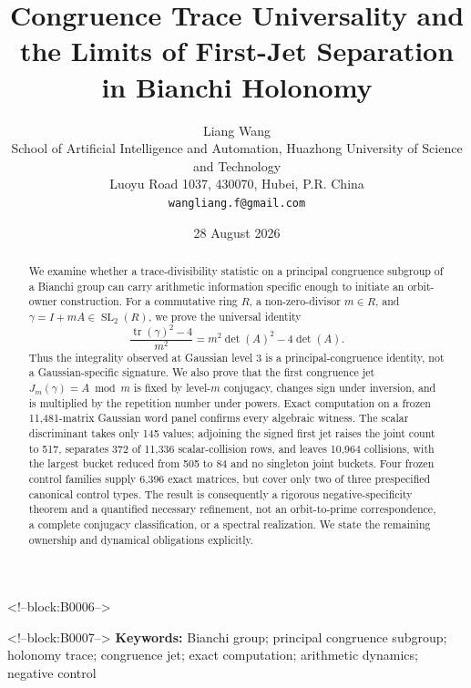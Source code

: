 \documentclass[11pt,a4paper]{article}
\title{Congruence Trace Universality and the Limits of First-Jet Separation in Bianchi Holonomy}
\author{Liang Wang\\
\small School of Artificial Intelligence and Automation, Huazhong University of Science and Technology\\
\small Luoyu Road 1037, 430070, Hubei, P.R. China\\
\small \texttt{wangliang.f@gmail.com}}
\date{28 August 2026}
\theoremstyle{definition}
\theoremstyle{remark}
\newcommand{\SL}{\operatorname{SL}}
\newcommand{\tr}{\operatorname{tr}}
\begin{document}
\maketitle

<!--block:B0006-->
\begin{abstract}
We examine whether a trace-divisibility statistic on a principal congruence subgroup of a Bianchi group can carry arithmetic information specific enough to initiate an orbit-owner construction. For a commutative ring \(R\), a non-zero-divisor \(m\in R\), and \(\gamma=I+mA\in\SL_2(R)\), we prove the universal identity
\[
  \frac{\tr(\gamma)^2-4}{m^2}=m^2\det(A)^2-4\det(A).
\]
Thus the integrality observed at Gaussian level \(3\) is a principal-congruence identity, not a Gaussian-specific signature. We also prove that the first congruence jet \(J_m(\gamma)=A\bmod m\) is fixed by level-\(m\) conjugacy, changes sign under inversion, and is multiplied by the repetition number under powers. Exact computation on a frozen 11,481-matrix Gaussian word panel confirms every algebraic witness. The scalar discriminant takes only 145 values; adjoining the signed first jet raises the joint count to 517, separates 372 of 11,336 scalar-collision rows, and leaves 10,964 collisions, with the largest bucket reduced from 505 to 84 and no singleton joint buckets. Four frozen control families supply 6,396 exact matrices, but cover only two of three prespecified canonical control types. The result is consequently a rigorous negative-specificity theorem and a quantified necessary refinement, not an orbit-to-prime correspondence, a complete conjugacy classification, or a spectral realization. We state the remaining ownership and dynamical obligations explicitly.
\end{abstract}

<!--block:B0007-->
\noindent\textbf{Keywords:} Bianchi group; principal congruence subgroup; holonomy trace; congruence jet; exact computation; arithmetic dynamics; negative control
\end{document}

